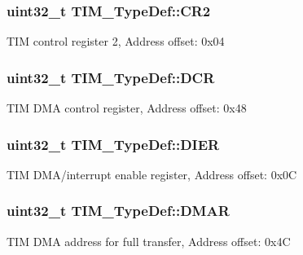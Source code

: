\subsubsection[{\texorpdfstring{C\+R2}{CR2}}]{ uint32\+\_\+t T\+I\+M\+\_\+\+Type\+Def\+::\+C\+R2}\hypertarget{struct_t_i_m___type_def_a6b1ae85138ed91686bf63699c61ef835}{}\label{struct_t_i_m___type_def_a6b1ae85138ed91686bf63699c61ef835}
T\+IM control register 2, Address offset\+: 0x04 
\subsubsection[{\texorpdfstring{D\+CR}{DCR}}]{ uint32\+\_\+t T\+I\+M\+\_\+\+Type\+Def\+::\+D\+CR}\hypertarget{struct_t_i_m___type_def_a7efe9ea8067044cac449ada756ebc2d1}{}\label{struct_t_i_m___type_def_a7efe9ea8067044cac449ada756ebc2d1}
T\+IM D\+MA control register, Address offset\+: 0x48 
\subsubsection[{\texorpdfstring{D\+I\+ER}{DIER}}]{ uint32\+\_\+t T\+I\+M\+\_\+\+Type\+Def\+::\+D\+I\+ER}\hypertarget{struct_t_i_m___type_def_a22a33c78ca5bec0e3e8559164a82b8ef}{}\label{struct_t_i_m___type_def_a22a33c78ca5bec0e3e8559164a82b8ef}
T\+IM D\+M\+A/interrupt enable register, Address offset\+: 0x0C 
\subsubsection[{\texorpdfstring{D\+M\+AR}{DMAR}}]{ uint32\+\_\+t T\+I\+M\+\_\+\+Type\+Def\+::\+D\+M\+AR}\hypertarget{struct_t_i_m___type_def_afb7114ac49dba07ba5d250c507dbf23d}{}\label{struct_t_i_m___type_def_afb7114ac49dba07ba5d250c507dbf23d}
T\+IM D\+MA address for full transfer, Address offset\+: 0x4C 

